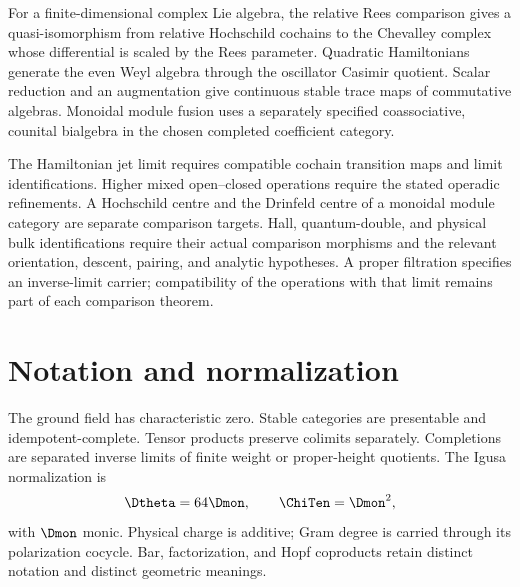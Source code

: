 \documentclass[11pt,twoside,openright]{memoir}
\begin{document}
For a finite-dimensional complex Lie algebra, the relative Rees comparison gives a quasi-isomorphism from relative Hochschild cochains to the Chevalley complex whose differential is scaled by the Rees parameter. Quadratic Hamiltonians generate the even Weyl algebra through the oscillator Casimir quotient. Scalar reduction and an augmentation give continuous stable trace maps of commutative algebras. Monoidal module fusion uses a separately specified coassociative, counital bialgebra in the chosen completed coefficient category.

The Hamiltonian jet limit requires compatible cochain transition maps and limit identifications. Higher mixed open--closed operations require the stated operadic refinements. A Hochschild centre and the Drinfeld centre of a monoidal module category are separate comparison targets. Hall, quantum-double, and physical bulk identifications require their actual comparison morphisms and the relevant orientation, descent, pairing, and analytic hypotheses. A proper filtration specifies an inverse-limit carrier; compatibility of the operations with that limit remains part of each comparison theorem.

\chapter*{Notation and normalization}
The ground field has characteristic zero.  Stable categories are presentable and idempotent-complete.  Tensor products preserve colimits separately.  Completions are separated inverse limits of finite weight or proper-height quotients.  The Igusa normalization is
\[
 \Dtheta=64\Dmon,\qquad \ChiTen=\Dmon^2,
\]
with $\Dmon$ monic.  Physical charge is additive; Gram degree is carried through its polarization cocycle.  Bar, factorization, and Hopf coproducts retain distinct notation and distinct geometric meanings.

\tableofcontents
\mainmatter








\backmatter


\end{document}
